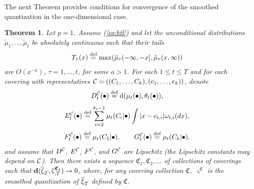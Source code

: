 \documentclass{article}              %
\newtheorem{theorem}{Theorem}
\begin{document}
\noindent The next Theorem provides conditions for convergence of the smoothed quantization
in the one-dimensional case.
\begin{theorem}
\label{thm:conv}Let $p=1$. Assume (\ref{eq:htl}) and let the unconditional distributions  $\tilde{\mu}_{1},\dots,\tilde{\mu}_{t}$
be absolutely continuous such that their tails $$T_\tau(x) \stackrel{\text{\rm def}}{=} \max(\tilde \mu_\tau(-\infty,-x],\tilde \mu_\tau(x,\infty))$$ are $O(x^{-a})$, $\tau=1,\dots,t$,
for some $a>1$. For each $1\leq t\leq T$ and for each covering with representatives
$\mathcal{C}=((C_{1},\dots,C_{k}),(e_{1},\dots,e_{k}))$, denote
\begin{equation}
D_{t}^{\mathcal{C}}(\bullet)\stackrel{\text{\rm def}}{=}\mathrm{d}(\mu_{t}(\bullet),\theta_{t}(\bullet)),\label{eq:firstlip}
\end{equation}
\begin{equation}
E_{t}^{\mathcal{C}}(\bullet)\stackrel{\text{\rm def}}{=}\sum_{i=2}^{k_{t}-1}\mu_{t}(C_{i}|\bullet)\int|x-e_{t,i}|\omega_{t,i}(dx),\label{eq:seclip}
\end{equation}
\begin{equation}
F_{t}^{\mathcal{C}}(\bullet)\stackrel{\text{\rm def}}{=}\mu_{t}(C_{1}|\bullet),\qquad G_{t}^{\mathcal{C}}(\bullet)\stackrel{\text{\rm def}}{=}\mu_{t}(C_{k}|\bullet),\label{eq:thirdlip}
\end{equation}
and assume that $D^{\mathcal{C}}$, $E^{\mathcal{C}}$, $F^{\mathcal{C}}$, and $G^{\mathcal{C}}$ are Lipschitz (the Lipschitz constants may depend on $\mathcal{C}$). Then there
exists a sequence $\mathfrak{C}_{1},\mathfrak{C}_{2},\dots$ of collections
of coverings such that $\mathbf{d}(\overline{\xi}_{T},\overline{\varsigma}_{,T}^{\boldsymbol{\mathfrak{C}_{i}}})\rightarrow0$,
where, for any covering collection $\mathfrak{C},$ $\varsigma^{\mathfrak{C}}$
is the smoothed quantization of $\overline{\xi}_{T}$ defined by $\mathfrak{C}$.
\end{theorem}
\end{document}

